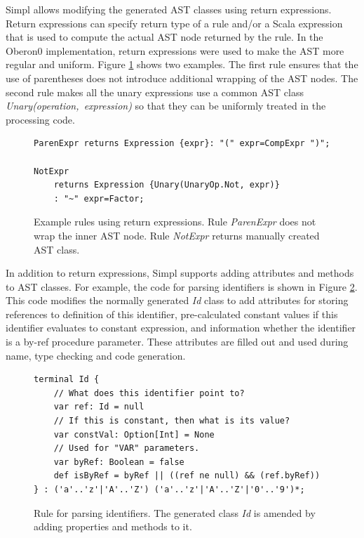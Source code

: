 Simpl allows modifying the generated AST classes using return expressions.
Return expressions can specify return type of a rule and/or a Scala
expression that is used to compute the actual AST node returned by
the rule. In the Oberon0 implementation, return expressions were used
to make the AST more regular and uniform. Figure \ref{fig:Using-return-expressions}
shows two examples. The first rule ensures that the use of parentheses
does not introduce additional wrapping of the AST nodes. The second
rule makes all the unary expressions use a common AST class \emph{Unary(operation,~expression)}
so that they can be uniformly treated in the processing code. 

%
\begin{figure}[!h]
{\small }
\begin{lstlisting}[basicstyle={\footnotesize\ttfamily}]
ParenExpr returns Expression {expr}: "(" expr=CompExpr ")";

NotExpr
    returns Expression {Unary(UnaryOp.Not, expr)}
    : "~" expr=Factor;
\end{lstlisting}
{\small \par}

\caption{\label{fig:Using-return-expressions}Example rules using return expressions.
Rule \emph{ParenExpr} does not wrap the inner AST node. Rule \emph{NotExpr}
returns manually created AST class.}

\end{figure}






In addition to return expressions, Simpl supports adding attributes
and methods to AST classes. For example, the code for parsing identifiers
is shown in Figure \ref{fig:Adding-properties}. This code modifies
the normally generated \emph{Id} class to add attributes for storing
references to definition of this identifier, pre-calculated constant
values if this identifier evaluates to constant expression, and information
whether the identifier is a by-ref procedure parameter. These attributes
are filled out and used during name, type checking and code generation.

%
\begin{figure}[!h]
{\small }
\begin{lstlisting}[basicstyle={\footnotesize\ttfamily}]
terminal Id {
    // What does this identifier point to?
    var ref: Id = null
    // If this is constant, then what is its value?
    var constVal: Option[Int] = None
    // Used for "VAR" parameters.
    var byRef: Boolean = false
    def isByRef = byRef || ((ref ne null) && (ref.byRef))
} : ('a'..'z'|'A'..'Z') ('a'..'z'|'A'..'Z'|'0'..'9')*;
\end{lstlisting}
{\small \par}

\caption{\label{fig:Adding-properties}Rule for parsing identifiers. The generated
class \emph{Id} is amended by adding properties and methods to it.}

\end{figure}



